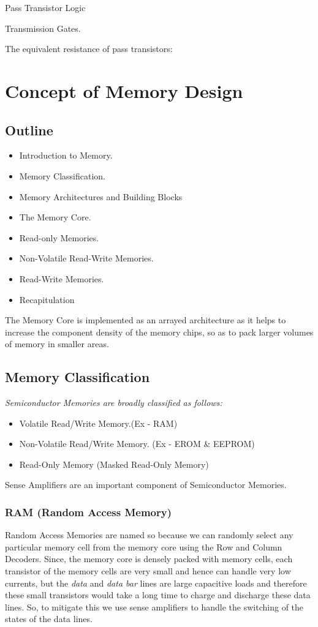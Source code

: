 \documentclass[12pt, letterpaper]{article}
\begin{document}
							Pass Transistor Logic


Transmission Gates.


The equivalent resistance of pass transistors:





\section{Concept of Memory Design}

\subsection{Outline}
\begin{itemize}
    \item Introduction to Memory.
    \item Memory Classification.
    \item Memory Architectures and Building Blocks
    \item The Memory Core.
    \item	Read-only Memories.
    \item	Non-Volatile Read-Write Memories.
    \item Read-Write Memories.
    \item Recapitulation
\end{itemize}

The Memory Core is implemented as an arrayed architecture as it helps to increase the component density of the memory chips, so as to pack larger volumes of memory in smaller areas. 
\subsection{Memory Classification}
\emph{Semiconductor Memories are broadly classified as follows:}
\begin{itemize}
    \item  Volatile Read/Write Memory.(Ex - RAM)
    \item Non-Volatile Read/Write Memory. (Ex - EROM \& EEPROM)
    \item Read-Only Memory (Masked Read-Only Memory)
\end{itemize}

Sense Amplifiers are an important component of Semiconductor Memories.

\subsubsection{RAM (Random Access Memory)}
Random Access Memories are named so because we can randomly select any particular memory cell from the memory core using the Row and Column Decoders.
Since, the memory core is densely packed with memory cells, each transistor of the memory cells are very small and hence can handle very low currents, but the \textit{data} and \textit{data bar} lines are large capacitive loads and therefore these small transistors would take a long time to charge and discharge these data lines. So, to mitigate this we use sense amplifiers to handle the switching of the states of the data lines.
\end{document}
